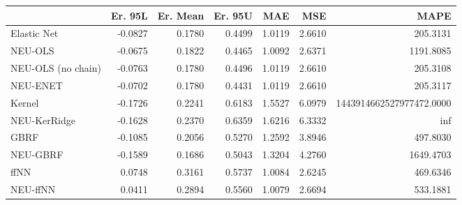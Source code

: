 \begin{tabular}{lrrrrrr}
\toprule
{} &  Er. 95L &  Er. Mean &  Er. 95U &    MAE &    MSE &                     MAPE \\
\midrule
Elastic Net        &  -0.0827 &    0.1780 &   0.4499 & 1.0119 & 2.6610 &                 205.3131 \\
NEU-OLS            &  -0.0675 &    0.1822 &   0.4465 & 1.0092 & 2.6371 &                1191.8085 \\
NEU-OLS (no chain) &  -0.0763 &    0.1780 &   0.4496 & 1.0119 & 2.6610 &                 205.3108 \\
NEU-ENET           &  -0.0702 &    0.1780 &   0.4431 & 1.0119 & 2.6610 &                 205.3117 \\
Kernel             &  -0.1726 &    0.2241 &   0.6183 & 1.5527 & 6.0979 & 1443914662527977472.0000 \\
NEU-KerRidge       &  -0.1628 &    0.2370 &   0.6359 & 1.6216 & 6.3332 &                      inf \\
GBRF               &  -0.1085 &    0.2056 &   0.5270 & 1.2592 & 3.8946 &                 497.8030 \\
NEU-GBRF           &  -0.1589 &    0.1686 &   0.5043 & 1.3204 & 4.2760 &                1649.4703 \\
ffNN               &   0.0748 &    0.3161 &   0.5737 & 1.0084 & 2.6245 &                 469.6346 \\
NEU-ffNN           &   0.0411 &    0.2894 &   0.5560 & 1.0079 & 2.6694 &                 533.1881 \\
\bottomrule
\end{tabular}
